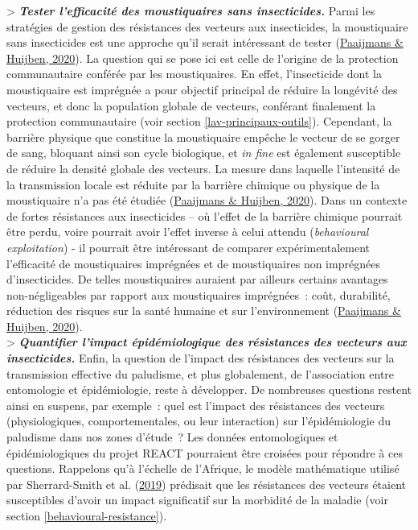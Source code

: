 \documentclass[12pt,twoside]{reedthesis}
\begin{document}
\textgreater{} \textbf{\emph{Tester l'efficacité des moustiquaires sans insecticides.}} Parmi les stratégies de gestion des résistances des vecteurs aux insecticides, la moustiquaire sans insecticides est une approche qu'il serait intéressant de tester (\protect\hyperlink{ref-paaijmans_taking_2020}{Paaijmans \& Huijben, 2020}). La question qui se pose ici est celle de l'origine de la protection communautaire conférée par les moustiquaires. En effet, l'insecticide dont la moustiquaire est imprégnée a pour objectif principal de réduire la longévité des vecteurs, et donc la population globale de vecteurs, conférant finalement la protection communautaire (voir section \ref{lav-principaux-outils}). Cependant, la barrière physique que constitue la moustiquaire empêche le vecteur de se gorger de sang, bloquant ainsi son cycle biologique, et \emph{in fine} est également susceptible de réduire la densité globale des vecteurs. La mesure dans laquelle l'intensité de la transmission locale est réduite par la barrière chimique ou physique de la moustiquaire n'a pas été étudiée (\protect\hyperlink{ref-paaijmans_taking_2020}{Paaijmans \& Huijben, 2020}). Dans un contexte de fortes résistances aux insecticides -- où l'effet de la barrière chimique pourrait être perdu, voire pourrait avoir l'effet inverse à celui attendu (\emph{behavioural exploitation}) - il pourrait être intéressant de comparer expérimentalement l'efficacité de moustiquaires imprégnées et de moustiquaires non imprégnées d'insecticides. De telles moustiquaires auraient par ailleurs certains avantages non-négligeables par rapport aux moustiquaires imprégnées~: coût, durabilité, réduction des risques sur la santé humaine et sur l'environnement (\protect\hyperlink{ref-paaijmans_taking_2020}{Paaijmans \& Huijben, 2020}).\\

\textgreater{} \textbf{\emph{Quantifier l'impact épidémiologique des résistances des vecteurs aux insecticides.}} Enfin, la question de l'impact des résistances des vecteurs sur la transmission effective du paludisme, et plus globalement, de l'association entre entomologie et épidémiologie, reste à développer. De nombreuses questions restent ainsi en suspens, par exemple~: quel est l'impact des résistances des vecteurs (physiologiques, comportementales, ou leur interaction) sur l'épidémiologie du paludisme dans nos zones d'étude~? Les données entomologiques et épidémiologiques du projet REACT pourraient être croisées pour répondre à ces questions. Rappelons qu'à l'échelle de l'Afrique, le modèle mathématique utilisé par Sherrard-Smith et al. (\protect\hyperlink{ref-sherrard-smith_mosquito_2019}{2019}) prédisait que les résistances des vecteurs étaient susceptibles d'avoir un impact significatif sur la morbidité de la maladie (voir section \ref{behavioural-resistance}).
\end{document}
